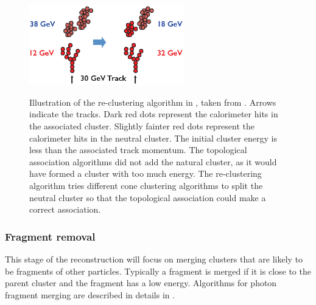 \begin{figure}[tbph]
\centering
{\includegraphics[width=0.6\textwidth]{pandora/recluster}}%
\caption[Illustration of the re-clustering algorithm in \pandora]
{Illustration of the re-clustering algorithm in \pandora, taken from \cite{Marshall:pandoraLC}. Arrows indicate the tracks. Dark red dots represent the calorimeter hits in the associated cluster. Slightly fainter red  dots represent the calorimeter hits in the neutral cluster. The initial cluster energy is less than the associated track momentum. The topological association algorithms did not add the natural cluster, as it would have formed a cluster with too much energy. The re-clustering algorithm tries different cone clustering algorithms to split the neutral cluster so that the topological association could make a correct association.}
\label{fig:pandoraRecluster}
\end{figure}

\subsubsection{Fragment removal}
\label{sec:pandoraFragmentRemoval}

This stage of the \pandora reconstruction will focus on merging clusters that are likely to be fragments of other particles. Typically a fragment is merged if it is close to the parent cluster and the fragment has a low energy.  Algorithms for photon fragment merging  are described in details in .

